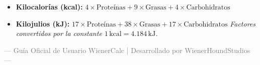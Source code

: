 \documentclass[11pt,a4paper]{article}
\begin{document}
\vspace{0.3cm}

\begin{tipbox}
\begin{itemize}
    \item \textbf{Kilocalorías (kcal):} $4 \times \text{Proteínas} + 9 \times \text{Grasas} + 4 \times \text{Carbohidratos}$
    \item \textbf{Kilojulios (kJ):} $17 \times \text{Proteínas} + 38 \times \text{Grasas} + 17 \times \text{Carbohidratos}$
    \textit{Factores convertidos por la constante $1\,\text{kcal} = 4.184\,\text{kJ}$.}
\end{itemize}
\end{tipbox}

\vspace{0.6cm}

\begin{center}
\textcolor{gray}{\small --- Guía Oficial de Usuario WienerCalc | Desarrollado por WienerHoundStudios ---}
\end{center}
\end{document}
